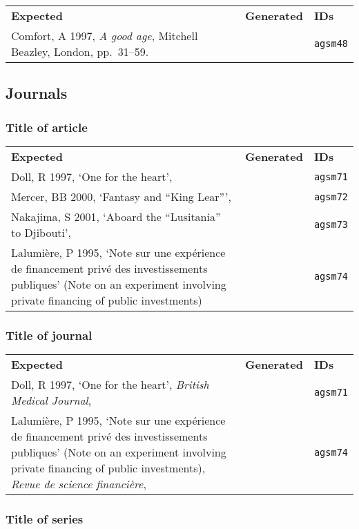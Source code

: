 \documentclass[a4paper,landscape,12pt]{article}
\newlength\q
\newlength\qr
\newenvironment{citetable}
  {\noindent\begin{longtable}{p{\q} p{\q} p{\qr}}\textbf{Expected} & \textbf{Generated} & \textbf{IDs}\\}
  {\end{longtable}}
\begin{document}
\begin{citetable}
	Comfort, A 1997, \textit{A good age}, Mitchell Beazley, London, pp.~31--59. & \fullcite{agsm48} & \texttt{agsm48} \\
\end{citetable}

\subsection{Journals}

\subsubsection{Title of article}

\begin{citetable}
	Doll, R 1997, `One for the heart', & \fullcite{agsm71} & \texttt{agsm71} \\
	Mercer, BB 2000, `Fantasy and ``King Lear''', & \fullcite{agsm72} & \texttt{agsm72} \\
	Nakajima, S 2001, `Aboard the ``Lusitania'' to Djibouti', & \fullcite{agsm73} & \texttt{agsm73} \\
	Lalumi\`{e}re, P 1995, `Note sur une exp\'{e}rience de financement priv\'{e} des investissements publiques' (Note on an experiment involving private financing of public investments) & \fullcite{agsm74} & \texttt{agsm74} \\
\end{citetable}

\subsubsection{Title of journal}

\begin{citetable}
	Doll, R 1997, `One for the heart', \textit{British Medical Journal}, & \fullcite{agsm71} & \texttt{agsm71} \\
	Lalumi\`{e}re, P 1995, `Note sur une exp\'{e}rience de financement priv\'{e} des investissements publiques' (Note on an experiment involving private financing of public investments), \textit{Revue de science financi\`{e}re}, & \fullcite{agsm74} & \texttt{agsm74} \\
\end{citetable}

\subsubsection{Title of series}
\end{document}
